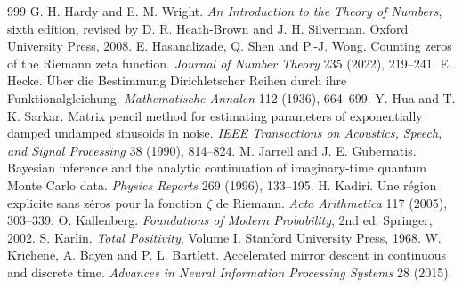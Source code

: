 \begin{thebibliography}{999}
 G. H. Hardy and E. M. Wright. \emph{An Introduction to the Theory of Numbers}, sixth edition, revised by D. R. Heath-Brown and J. H. Silverman. Oxford University Press, 2008.
 E. Hasanalizade, Q. Shen and P.-J. Wong. Counting zeros of the Riemann zeta function. \emph{Journal of Number Theory} 235 (2022), 219--241.
 E. Hecke. \"Uber die Bestimmung Dirichletscher Reihen durch ihre Funktionalgleichung. \emph{Mathematische Annalen} 112 (1936), 664--699.
 Y. Hua and T. K. Sarkar. Matrix pencil method for estimating parameters of exponentially damped undamped sinusoids in noise. \emph{IEEE Transactions on Acoustics, Speech, and Signal Processing} 38 (1990), 814--824.
 M. Jarrell and J. E. Gubernatis. Bayesian inference and the analytic continuation of imaginary-time quantum Monte Carlo data. \emph{Physics Reports} 269 (1996), 133--195.
 H. Kadiri. Une r\'egion explicite sans z\'eros pour la fonction $\zeta$ de Riemann. \emph{Acta Arithmetica} 117 (2005), 303--339.
 O. Kallenberg. \emph{Foundations of Modern Probability}, 2nd ed. Springer, 2002.
 S. Karlin. \emph{Total Positivity}, Volume I. Stanford University Press, 1968.
 W. Krichene, A. Bayen and P. L. Bartlett. Accelerated mirror descent in continuous and discrete time. \emph{Advances in Neural Information Processing Systems} 28 (2015).

\end{thebibliography}
